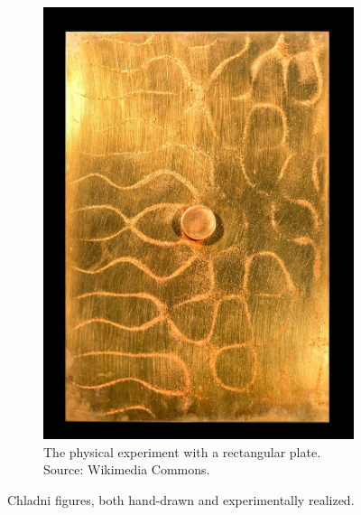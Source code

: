 \documentclass[11pt]{article}
\begin{document}
\begin{figure}
\begin{subfigure}[h]{0.4\textwidth}
		\includegraphics[width=\textwidth]{Figures/chladni_plate.jpg}
		\caption{The physical experiment with a rectangular plate. Source: Wikimedia Commons.}
		\label{fig:chladni-plate}
	\end{subfigure}
	\caption{Chladni figures, both hand-drawn and experimentally realized.}
\end{figure}
\end{document}
